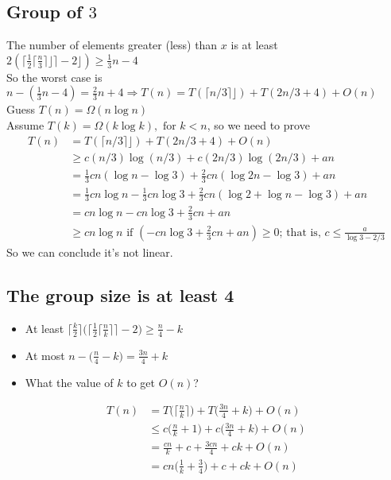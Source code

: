 \documentclass[a4paper]{article}
\begin{document}
\subsection{Group of $3$}
    The number of elements greater (less) than $x$ is at least $2(\bigl\lceil \frac{1}{2}\lceil{\frac{n}{3}}\rceil⌋\bigr\rceil-2⌋)\geq \frac{1}{3}n-4$\\
    So the worst case is $n-(\frac{1}{3}n-4)=\frac{2}{3}n+4\Rightarrow T(n) = T(\lceil{n/3}\rceil⌋)+T(2n/3+4) + O(n)$\\
    Guess $T(n)=\Omega(n\log n)$\\
    Assume $T(k)=\Omega(k\log k), \text{ for } k<n$, so we need to prove
    \begin{align*}
        T(n) & = T(\lceil{n/3}\rceil⌋)+T(2n/3+4) + O(n) \\
        & \geq c(n/3)\log (n/3)+c(2n/3)\log (2n/3) + an \\
        & =\frac{1}{3}cn(\log n -\log 3)+\frac{2}{3}cn(\log 2n -\log 3) + an\\
        & =\frac{1}{3}cn\log n -\frac{1}{3}cn\log 3+\frac{2}{3}cn(\log 2 + \log n -\log 3) + an\\
        & = cn\log n -cn\log 3+\frac{2}{3}cn + an\\
        & \geq cn\log n \text{ if } (-cn\log 3+\frac{2}{3}cn + an)\geq0 \text{; that is, } c\leq \frac{a}{\log 3 - 2/3}
    \end{align*}
    So we can conclude it's not linear.

\subsection{The group size is at least 4}
    \begin{itemize}
        \item At least $\Big\lceil{\frac{k}{2}}\Big\rceil\bigg(\Big\lceil{\frac{1}{2}\big\lceil{\frac{n}{k}}\big\rceil}\Big\rceil-2\bigg)\geq \frac{n}{4}-k$
        \item At most $n-\big(\frac{n}{4}-k\big)=\frac{3n}{4}+k$
        \item What the value of $k$ to get $O(n)$?
    \end{itemize}
    \begin{align*}
        T(n)&= T\Big(\Big\lceil{\frac{n}{k}}\Big\rceil\Big)+T\Big(\frac{3n}{4}+k\Big)+O(n)\\
        &\leq c\Big(\frac{n}{k}+1\Big)+c\Big(\frac{3n}{4}+k\Big)+O(n)\\
        &=\frac{cn}{k}+c+\frac{3cn}{4}+ck+O(n)\\
        &=cn\Big(\frac{1}{k}+\frac{3}{4}\Big)+c+ck+O(n)
    \end{align*}
\end{document}
